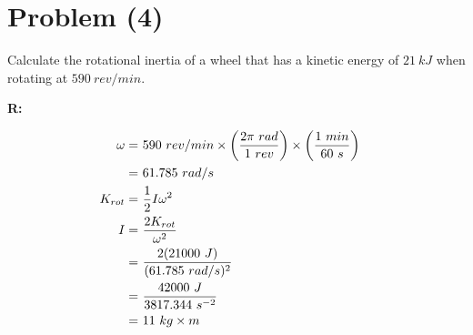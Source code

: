 \section{Problem (4)}

	Calculate the rotational inertia of a wheel that has a kinetic energy of $21 \ kJ$ when rotating at $590 \ rev/min$.

	\textbf{R:}

	\begin{align}
		\omega = \ &590 \ rev/min
		\times \left( \frac{2 \pi \ rad}{1 \ rev} \right)
		\times \left( \frac{1 \ min}{60 \ s} \right)& \notag \\
		= \ &61.785 \ rad/s& \notag \\
		K_{rot} = \ &\frac{1}{2} I \omega^{2}& \notag \\
		I = \ &\frac{2 K_{rot}}{\omega^{2}}& \notag \\
		= \ &\frac{2 (21000 \ J)}{(61.785 \ rad/s)^{2}}& \notag \\
		= \ &\frac{42000 \ J}{3817.344 \ s^{-2}}& \notag \\
		= \ &11 \ kg \times m&
	\end{align}
